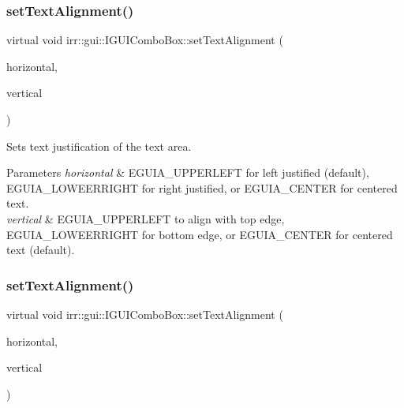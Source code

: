 \subsubsection{\texorpdfstring{set\+Text\+Alignment()}{setTextAlignment()}\hspace{0.1cm}{\footnotesize\ttfamily [1/2]}}
{\footnotesize\ttfamily virtual void irr\+::gui\+::\+I\+G\+U\+I\+Combo\+Box\+::set\+Text\+Alignment (\begin{DoxyParamCaption}\item[{\hyperlink{namespaceirr_1_1gui_a19eb5fb40e67f108cb16aba922ddaa2d}{E\+G\+U\+I\+\_\+\+A\+L\+I\+G\+N\+M\+E\+NT}}]{horizontal,  }\item[{\hyperlink{namespaceirr_1_1gui_a19eb5fb40e67f108cb16aba922ddaa2d}{E\+G\+U\+I\+\_\+\+A\+L\+I\+G\+N\+M\+E\+NT}}]{vertical }\end{DoxyParamCaption})\hspace{0.3cm}{\ttfamily [pure virtual]}}



Sets text justification of the text area. 


\begin{DoxyParams}{Parameters}
{\em horizontal} & E\+G\+U\+I\+A\+\_\+\+U\+P\+P\+E\+R\+L\+E\+FT for left justified (default), E\+G\+U\+I\+A\+\_\+\+L\+O\+W\+E\+E\+R\+R\+I\+G\+HT for right justified, or E\+G\+U\+I\+A\+\_\+\+C\+E\+N\+T\+ER for centered text. \\
\hline
{\em vertical} & E\+G\+U\+I\+A\+\_\+\+U\+P\+P\+E\+R\+L\+E\+FT to align with top edge, E\+G\+U\+I\+A\+\_\+\+L\+O\+W\+E\+E\+R\+R\+I\+G\+HT for bottom edge, or E\+G\+U\+I\+A\+\_\+\+C\+E\+N\+T\+ER for centered text (default). \\
\hline
\end{DoxyParams}
\mbox{\label{classirr_1_1gui_1_1IGUIComboBox_a902681b9cfc783d29270f919ab3e71d8}} 
\subsubsection{\texorpdfstring{set\+Text\+Alignment()}{setTextAlignment()}\hspace{0.1cm}{\footnotesize\ttfamily [2/2]}}
{\footnotesize\ttfamily virtual void irr\+::gui\+::\+I\+G\+U\+I\+Combo\+Box\+::set\+Text\+Alignment (\begin{DoxyParamCaption}\item[{\hyperlink{namespaceirr_1_1gui_a19eb5fb40e67f108cb16aba922ddaa2d}{E\+G\+U\+I\+\_\+\+A\+L\+I\+G\+N\+M\+E\+NT}}]{horizontal,  }\item[{\hyperlink{namespaceirr_1_1gui_a19eb5fb40e67f108cb16aba922ddaa2d}{E\+G\+U\+I\+\_\+\+A\+L\+I\+G\+N\+M\+E\+NT}}]{vertical }\end{DoxyParamCaption})\hspace{0.3cm}{\ttfamily [pure virtual]}}



